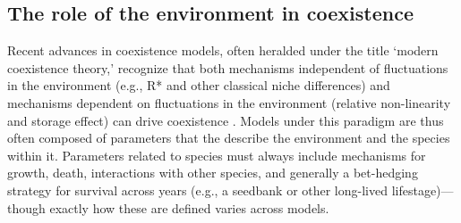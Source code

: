 \documentclass[11pt,letterpaper]{article}
\begin{document}


\subsection{The role of the environment in coexistence} %
Recent advances in coexistence models, often heralded under the title `modern coexistence theory,' recognize that both mechanisms independent of fluctuations in the environment (e.g., R* and other classical niche differences) and mechanisms dependent on fluctuations in the environment (relative non-linearity and storage effect) can drive coexistence \citep{Chesson:1997dz,Chesson:2000vd}. Models under this paradigm are thus often composed of parameters that the describe the environment and the species within it. Parameters related to species must always include mechanisms for growth, death, interactions with other species, and generally a bet-hedging strategy for survival across years (e.g., a seedbank or other long-lived lifestage)---though exactly how these are defined varies across models.
\end{document}
